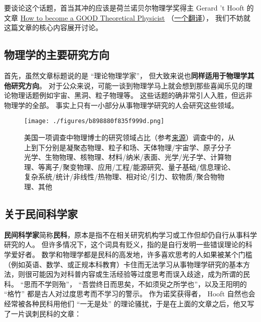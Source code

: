 
\begin{issues}
\issueDraft
\end{issues}

要谈论这个话题，首当其冲的应该是荷兰诺贝尔物理学奖得主 Gerard 't Hooft 的文章 \href{https://webspace.science.uu.nl/~hooft101/theorist.html}{How to become a GOOD Theoretical Physicist} （\href{https://xialab.pku.edu.cn/kytdyw1/zdylm.m.jsp?wbtreeid=1011&tstreeid=11956&_t_uid=2945&language=en&homepageuuid=BF649325C5584FC683CE0B601D21AC65&templateuuid=4CC182410BA14FF8B55ED726FB2087FB&producttype=0&_tmode_=99&tsitesapptype=zdylm}{一个翻译}）， 我们不妨就这篇文章的核心内容展开讨论。

\subsection{物理学的主要研究方向}
首先，虽然文章标题说的是 “理论物理学家”， 但大致来说也\textbf{同样适用于物理学其他研究方向}。 对于公众来说，可能一谈到物理学马上就会想到那些喜闻乐见的理论物理话题例如宇宙、黑洞、粒子物理等。 这些话题的确非常引人入胜，但远非物理学的全部。 事实上只有一小部分从事物理学研究的人会研究这些领域。

\begin{figure}[ht]
\centering
\texttt{[image: ./figures/b898880f835f999d.png]}
\caption{美国一项调查中物理博士的研究领域占比（参考\href{https://ww2.aip.org/statistics/trends-in-physics-phds}{来源}）调查中的，从上到下分别是凝聚态物理、粒子和场、天体物理/宇宙学、原子分子光学、生物物理、核物理、材料/纳米/表面、光学/光子学、计算物理、等离子/聚变物理、应用/工程/能源研究、量子基础/信息理论、复杂系统/统计/非线性/热物理、相对论/引力、软物质/聚合物物理、其他} \label{fig_SdyPhy_1}
\end{figure}

\subsection{关于民间科学家}
\textbf{民间科学家}简称\textbf{民科}，原本是指不在相关研究机构学习或工作但却仍自行从事科学研究的人。 但许多情况下，这个词具有贬义，指的是自行发明一些错误理论的科学爱好者。 数学和物理学都是民科的高发地，许多喜欢思考的人如果被某个门槛（例如英语、数学、或正规本科教育）卡住而无法学习从事物理学研究的基本方法，则很可能因为对科普内容或生活经验等过度思考而误入歧途，成为所谓的民科。 “思而不学则殆”， “吾尝终日而思矣，不如须臾之所学也”，以及王阳明的 “格竹” 都是古人对过度思考而不学习的警示。 作为诺奖获得者， Hooft 自然也会经常被各种民科用他们 “一无是处” 的理论骚扰，于是在上面的文章之后，他又写了一片讽刺民科的文章：

